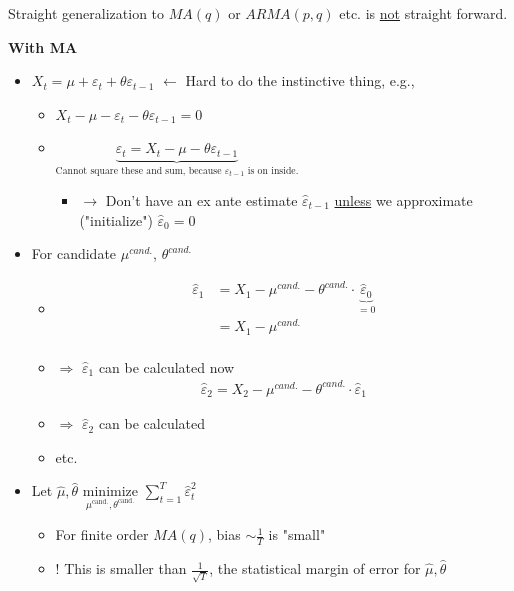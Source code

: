 Straight generalization to $MA(q)$ or $ARMA(p,q)$ etc. is \underline{not} straight forward.

\textbf{With MA}
\begin{itemize}
    \item $X_t=\mu+\varepsilon_t+\theta\varepsilon_{t-1}$ $\leftarrow$ Hard to do the instinctive thing, e.g.,
    \begin{itemize}
        \item[] $X_t-\mu-\varepsilon_t-\theta\varepsilon_{t-1}=0$
        \item[] $\underbrace{\varepsilon_t=X_t-\mu-\theta\varepsilon_{t-1}}_\text{Cannot square these and sum, because $\varepsilon_{t-1}$ is on inside.}$
        \begin{itemize}
            \item[] $\rightarrow$ Don't have an ex ante estimate $\hat{\varepsilon}_{t-1}$ \underline{unless} we approximate ("initialize") $\hat{\varepsilon}_0=0$
        \end{itemize}
    \end{itemize}
    \item For candidate $\mu^{\textit{cand.}}$, $\theta^{\textit{cand.}}$
    \begin{itemize}
        \item[]
        \begin{align*}
            \hat{\varepsilon}_1&=X_1-\mu^{\textit{cand.}}-\theta^{\textit{cand.}}\cdot \underbrace{\hat{\varepsilon}_0}_{=0}\\
            &=X_1-\mu^{\textit{cand.}}\\
        \end{align*}
        \item[]$\Rightarrow$ $\hat{\varepsilon}_1$ can be calculated now
        \begin{align*}
            \hat{\varepsilon}_2=X_2-\mu^{\textit{cand.}}-\theta^{\textit{cand.}} \cdot \hat{\varepsilon}_1
        \end{align*}
        \item[]$\Rightarrow$ $\hat{\varepsilon}_2$ can be calculated 
        \item[] etc.
    \end{itemize}
    \item[] Let $\hat{\mu}, \hat{\theta}$ $\underset{\mu^{\text{cand.}},\theta^{\text{cand.}}}{\text{minimize}}$ $\sum_{t=1}^T \hat{\varepsilon}_t^2$
    \begin{itemize}
        \item[] For finite order $MA(q)$, bias $\sim \frac{1}{T}$ is "small"
        \item[] ! This is smaller than $\frac{1}{\sqrt{T}}$, the statistical margin of error for $\hat{\mu}, \hat{\theta}$
    \end{itemize}
\end{itemize}

